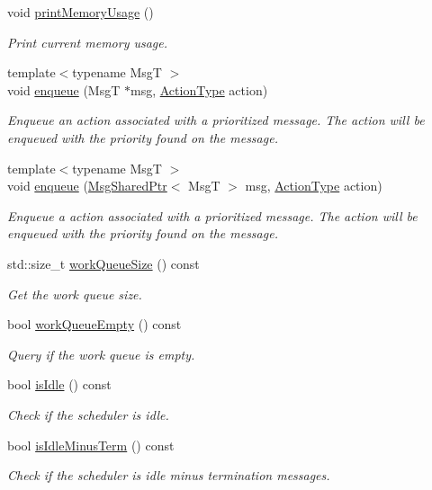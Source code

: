 \begin{DoxyCompactItemize}
void \hyperlink{structvt_1_1sched_1_1_scheduler_a48a6fdb0c7384df09b467c0e68ca8e6f}{print\+Memory\+Usage} ()
\begin{DoxyCompactList}\small\item\em Print current memory usage. \end{DoxyCompactList}\item 
{\footnotesize template$<$typename MsgT $>$ }\\void \hyperlink{structvt_1_1sched_1_1_scheduler_a0005e1bc981fe4f4386659a59e361299}{enqueue} (MsgT $\ast$msg, \hyperlink{namespacevt_ae0a5a7b18cc99d7b732cb4d44f46b0f3}{Action\+Type} action)
\begin{DoxyCompactList}\small\item\em Enqueue an action associated with a prioritized message. The action will be enqueued with the priority found on the message. \end{DoxyCompactList}\item 
{\footnotesize template$<$typename MsgT $>$ }\\void \hyperlink{structvt_1_1sched_1_1_scheduler_a1dd080d38a734d294955aa8293ac9b36}{enqueue} (\hyperlink{namespacevt_ab2b3d506ec8e8d1540aede826d84a239}{Msg\+Shared\+Ptr}$<$ MsgT $>$ msg, \hyperlink{namespacevt_ae0a5a7b18cc99d7b732cb4d44f46b0f3}{Action\+Type} action)
\begin{DoxyCompactList}\small\item\em Enqueue a action associated with a prioritized message. The action will be enqueued with the priority found on the message. \end{DoxyCompactList}\item 
std\+::size\+\_\+t \hyperlink{structvt_1_1sched_1_1_scheduler_a6ee315ffd90f37a277bb2b5622af1f4f}{work\+Queue\+Size} () const
\begin{DoxyCompactList}\small\item\em Get the work queue size. \end{DoxyCompactList}\item 
bool \hyperlink{structvt_1_1sched_1_1_scheduler_a49bfd7d4a6d187c6c995b84885a1ed19}{work\+Queue\+Empty} () const
\begin{DoxyCompactList}\small\item\em Query if the work queue is empty. \end{DoxyCompactList}\item 
bool \hyperlink{structvt_1_1sched_1_1_scheduler_a047e7a211a220c2729c51c36271c7bf1}{is\+Idle} () const
\begin{DoxyCompactList}\small\item\em Check if the scheduler is idle. \end{DoxyCompactList}\item 
bool \hyperlink{structvt_1_1sched_1_1_scheduler_a3229e007ac15bfb1d337428a52157817}{is\+Idle\+Minus\+Term} () const
\begin{DoxyCompactList}\small\item\em Check if the scheduler is idle minus termination messages. \end{DoxyCompactList}\end{DoxyCompactItemize}
